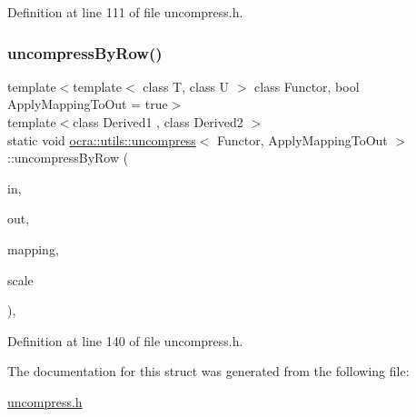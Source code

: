 Definition at line 111 of file uncompress.\+h.

\hypertarget{structocra_1_1utils_1_1uncompress_a5f188f2a0d0abeea1f219c4848b7b84b}{}\label{structocra_1_1utils_1_1uncompress_a5f188f2a0d0abeea1f219c4848b7b84b} 
\subsubsection{\texorpdfstring{uncompress\+By\+Row()}{uncompressByRow()}}
{\footnotesize\ttfamily template$<$template$<$ class T, class U $>$ class Functor, bool Apply\+Mapping\+To\+Out = true$>$ \\
template$<$class Derived1 , class Derived2 $>$ \\
static void \hyperlink{structocra_1_1utils_1_1uncompress}{ocra\+::utils\+::uncompress}$<$ Functor, Apply\+Mapping\+To\+Out $>$\+::uncompress\+By\+Row (\begin{DoxyParamCaption}\item[{const Matrix\+Base$<$ Derived1 $>$ \&}]{in,  }\item[{Matrix\+Base$<$ Derived2 $>$ \&}]{out,  }\item[{const std\+::vector$<$ int $>$ \&}]{mapping,  }\item[{double}]{scale }\end{DoxyParamCaption})\hspace{0.3cm}{\ttfamily [inline]}, {\ttfamily [static]}}



Definition at line 140 of file uncompress.\+h.



The documentation for this struct was generated from the following file\+:\begin{DoxyCompactItemize}
\item 
\hyperlink{uncompress_8h}{uncompress.\+h}\end{DoxyCompactItemize}
